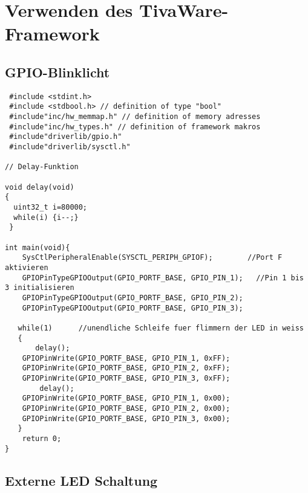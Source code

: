 \section{Verwenden des TivaWare-Framework}
\subsection{GPIO-Blinklicht}
\begin{lstlisting}
 #include <stdint.h>
 #include <stdbool.h> // definition of type "bool"
 #include"inc/hw_memmap.h" // definition of memory adresses
 #include"inc/hw_types.h" // definition of framework makros
 #include"driverlib/gpio.h"
 #include"driverlib/sysctl.h"
 
// Delay-Funktion

void delay(void)
{
  uint32_t i=80000;
  while(i) {i--;}
 }

int main(void){
    SysCtlPeripheralEnable(SYSCTL_PERIPH_GPIOF);        //Port F aktivieren
    GPIOPinTypeGPIOOutput(GPIO_PORTF_BASE, GPIO_PIN_1);   //Pin 1 bis 3 initialisieren
    GPIOPinTypeGPIOOutput(GPIO_PORTF_BASE, GPIO_PIN_2);
    GPIOPinTypeGPIOOutput(GPIO_PORTF_BASE, GPIO_PIN_3);

   while(1)      //unendliche Schleife fuer flimmern der LED in weiss
   {
       delay();
    GPIOPinWrite(GPIO_PORTF_BASE, GPIO_PIN_1, 0xFF);
    GPIOPinWrite(GPIO_PORTF_BASE, GPIO_PIN_2, 0xFF);
    GPIOPinWrite(GPIO_PORTF_BASE, GPIO_PIN_3, 0xFF);
        delay();
    GPIOPinWrite(GPIO_PORTF_BASE, GPIO_PIN_1, 0x00);
    GPIOPinWrite(GPIO_PORTF_BASE, GPIO_PIN_2, 0x00);
    GPIOPinWrite(GPIO_PORTF_BASE, GPIO_PIN_3, 0x00);
   }
    return 0;
}
\end{lstlisting}



\newpage
\subsection{Externe LED Schaltung}
